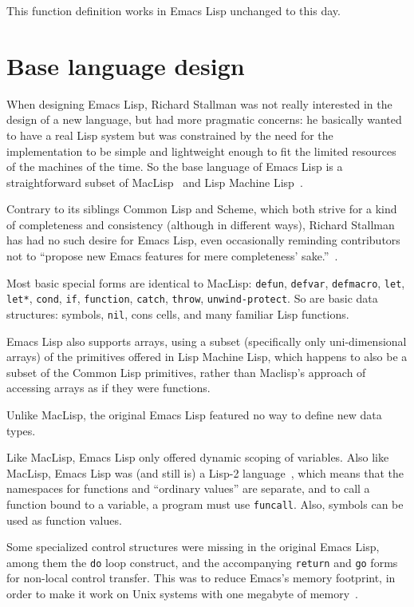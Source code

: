 \documentclass[format=acmsmall, review]{acmart}
\newcommand \Elisp {Emacs Lisp}
\begin{document}
This function definition works in \Elisp{} unchanged to this day.

\section{Base language design}
\label{sec:base-language-design}

When designing \Elisp{}, Richard Stallman was not really interested in the
design of a new language, but had more pragmatic concerns: he basically
wanted to have a real Lisp system but was constrained by the need for the
implementation to be simple and lightweight enough to fit the limited
resources of the machines of the time.  So the base language of \Elisp{} is
a straightforward subset of MacLisp~\cite{Moon1974,Pitman1983} and Lisp
Machine Lisp~\cite{WeinrebMoon1981}.

Contrary to its siblings Common Lisp and Scheme, which both strive for
a kind of completeness and consistency (although in different ways),
Richard Stallman has
had no such desire for \Elisp, even occasionally reminding contributors
not to ``propose new Emacs features for mere completeness'
sake.''~\cite{RMS-completeness}.

Most basic special forms are identical to MacLisp: \texttt{defun},
\texttt{defvar}, \texttt{defmacro}, \texttt{let}, \texttt{let*},
\texttt{cond}, \texttt{if}, \texttt{function}, \texttt{catch}, \texttt{throw},
\texttt{unwind-protect}.  So are basic data structures: symbols,
\texttt{nil}, cons cells, and many familiar Lisp functions.

\Elisp{} also supports arrays, using a subset (specifically only uni-dimensional
arrays) of the primitives offered in Lisp Machine Lisp, which happens to
also be a subset of the Common Lisp primitives, rather than Maclisp's
approach of accessing arrays as if they were functions.

Unlike MacLisp, the original \Elisp{} featured no way to define new
data types.


Like MacLisp, \Elisp{} only offered
dynamic scoping of variables.  Also like MacLisp, \Elisp{} was (and still is) a Lisp-2
language~\cite{SteeleGabriel1993}, which means that the namespaces for
functions and ``ordinary values'' are separate, and to call a function bound
to a variable, a program must use \texttt{funcall}.  Also, symbols can be
used as function values.

Some specialized control structures were missing in the original
\Elisp{}, among them the \texttt{do} loop construct, and the
accompanying \texttt{return} and \texttt{go} forms for non-local
control transfer.  This was to reduce Emacs's memory footprint, in
order to make it work on Unix systems with one megabyte of memory~\cite{Stallman2018-personal}.
\end{document}
